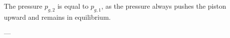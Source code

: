 The pressure \( p_{g,2} \) is equal to \( p_{g,1} \), as the pressure always pushes the piston upward and remains in equilibrium.  

---